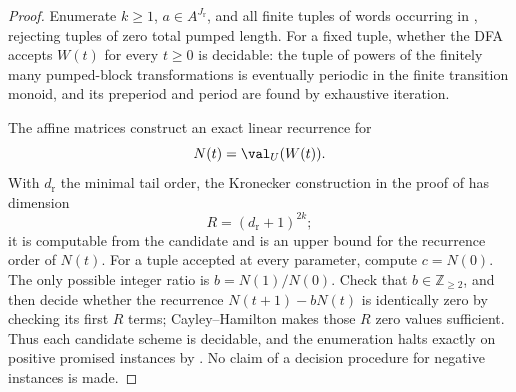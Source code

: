 \begin{proof}
  Enumerate \(k\ge1\), \(a\in A^{J_{\mathrm r}}\), and all finite tuples
  of words occurring in
  , rejecting tuples of zero
  total pumped length. For a fixed tuple, whether the DFA accepts
  \(W(t)\) for every \(t\ge0\) is decidable: the tuple of powers of the
  finitely many pumped-block transformations is eventually periodic in
  the finite transition monoid, and its preperiod and period are found
  by exhaustive iteration.

  The affine matrices construct an exact linear recurrence for
  \[
    N(t)=\val_U(W(t)).
  \]
  With \(d_{\mathrm r}\) the minimal tail order, the Kronecker construction
  in the proof of
   has dimension
  \[
    R=(d_{\mathrm r}+1)^{2k};
  \]
  it is computable from the candidate and is an upper bound for the
  recurrence order of \(N(t)\). For a tuple accepted at every parameter,
  compute \(c=N(0)\). The only
  possible integer ratio is \(b=N(1)/N(0)\). Check that
  \(b\in\mathbb Z_{\ge2}\), and then decide whether the recurrence
  \(N(t+1)-bN(t)\) is identically zero by checking its first \(R\) terms;
  Cayley--Hamilton makes those \(R\) zero values sufficient. Thus each
  candidate scheme is decidable, and the enumeration halts exactly on
  positive promised instances by
  . No claim of a
  decision procedure for negative instances is made.
\end{proof}

